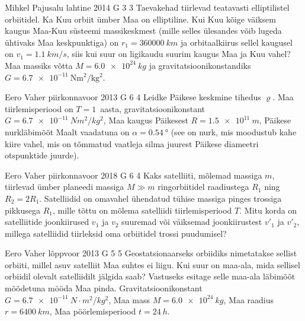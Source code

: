 \documentclass[11pt, twoside]{article}
\begin{document}
{%
{Mihkel Pajusalu} %
{lahtine} %
{2014} %
{G 3} %
{3} %
{
\ifStatement
Taevakehad tiirlevad teatavasti elliptilistel orbiitidel. Ka Kuu orbiit ümber Maa on elliptiline. Kui Kuu kõige väiksem kaugus Maa-Kuu süsteemi massikeskmest (mille selles ülesandes võib lugeda ühtivaks Maa keskpunktiga) on $r_{1}=\SI{360000}{km}$ ja orbitaalkiirus sellel kaugusel on $v_1=\SI{1.1}{km/s}$, siis kui suur on ligikaudu suurim kaugus Maa ja Kuu vahel? Maa massiks võtta $M=\SI{6.0e24}{kg}$ ja gravitatsioonikonstandiks $G=\SI{6.7e-11}{\newton\metre\squared\per\kilo\gram\squared}$.
\fi
}

{Eero Vaher} %
{piirkonnavoor} %
{2013} %
{G 6} %
{4} %
{
\ifStatement
Leidke Päikese keskmine tihedus $\varrho$. Maa
tiirlemisperiood on $T=1$~aasta, gravitatsioonikonstant 
$G=\SI{6.7e-11}{N m^2/kg^2}$, Maa kaugus Päikesest $R=\SI{1.5e11}{m}$, Päikese nurkläbimõõt Maalt vaadatuna on
$\alpha=\SI{0,54}{\degree}$ (see on nurk, mis moodustub kahe kiire vahel, mis on tõmmatud
vaatleja silma juurest Päikese diameetri otspunktide juurde).
\fi
}

{Eero Vaher} %
{piirkonnavoor} %
{2018} %
{G 6} %
{4} %
{
\ifStatement
Kaks satelliiti, mõlemad massiga $m$, tiirlevad ümber planeedi massiga $M\gg m$ ringorbiitidel raadiustega $R_1$ ning $R_2=2R_1$. Satelliidid on omavahel ühendatud tühise massiga pinges trossiga pikkusega $R_1$, mille tõttu on mõlema satelliidi tiirlemisperiood $T$. Mitu korda on satelliitide joonkiirused $v_1$ ja $v_2$ suuremad või väiksemad joonkiirustest $v'_1$ ja $v'_2$, millega satelliidid tiirleksid oma orbiitidel trossi puudumisel?
\fi
}

{Eero Vaher} %
{lõppvoor} %
{2013} %
{G 5} %
{5} %
{
\ifStatement
Geostatsionaarseks orbiidiks nimetatakse sellist orbiiti, millel asuv satelliit
Maa suhtes ei liigu. Kui suur on maa-ala, mida sellisel orbiidil olevalt
satelliidilt jälgida saab? Vastuseks esitage selle maa-ala läbimõõt mõõdetuna
mööda Maa pinda. Gravitatsioonikonstant $G=\SI{6.7e-11}{N \cdot m^2/kg^2}$, Maa
mass $M=\SI{6,0e24}{kg}$, Maa raadius $r=\SI{6400}{km}$, Maa
pöörlemisperiood $t=\SI{24}{h}$.
\fi
}
\newpage\subsection{\protect{}}

}
\end{document}
